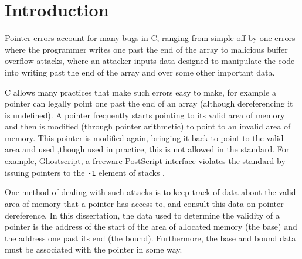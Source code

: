 \documentclass[a4paper,12pt,twoside,openright]{report}
\begin{document}
\onehalfspacing


\chapter{Introduction}
\setcounter{page}{1} 

Pointer errors account for many bugs in C, ranging from simple off-by-one errors where the programmer writes one past the end of the array to malicious buffer overflow attacks, where an attacker inputs data designed to manipulate the code into writing past the end of the array and over some other important data.

C allows many practices that make such errors easy to make, for example a pointer can legally point one past the end of an array (although dereferencing it is undefined).
A pointer frequently starts pointing to its valid area of memory and then is modified (through pointer arithmetic) to point to an invalid area of memory.
This pointer is modified again, bringing it back to point to the valid area and used ,though used in practice, this is not allowed in the standard.
For example, Ghostscript, a freeware PostScript interface violates the standard by issuing pointers to the \verb!-1! element of stacks \cite{ghostscript}.

One method of dealing with such attacks is to keep track of data about the valid area of memory that a pointer has access to, and consult this data on pointer dereference.
In this dissertation, the data used to determine the validity of a pointer is the address of the start of the area of allocated memory (the base) and the address one past its end (the bound).
Furthermore, the base and bound data must be associated with the pointer in some way.
\end{document}
